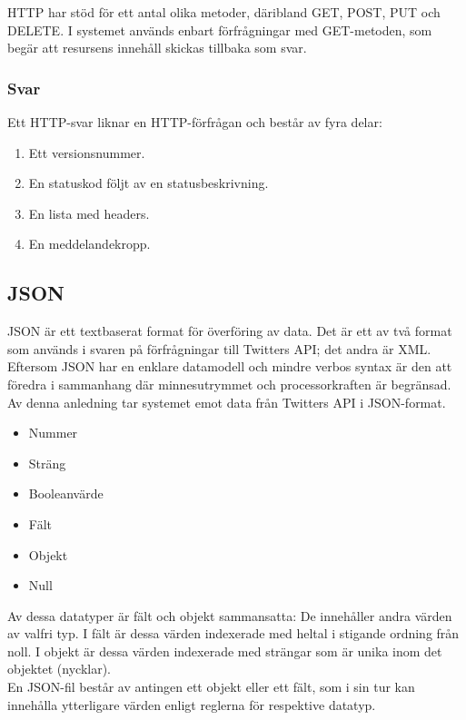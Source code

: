 \documentclass[a4paper,11pt]{article}
\begin{document}
HTTP har stöd för ett antal olika metoder, däribland GET, POST, PUT och DELETE. I systemet används enbart förfrågningar med GET-metoden, som begär att resursens innehåll skickas tillbaka som svar.
	
\subsubsection{Svar}
	
Ett HTTP-svar liknar en HTTP-förfrågan och består av fyra delar:

	\begin{enumerate}
    	\item Ett versionsnummer.
    	\item En statuskod följt av en statusbeskrivning.
    	\item En lista med headers.
    	\item En meddelandekropp.
    	\end{enumerate}

\subsection{JSON}

JSON är ett textbaserat format för överföring av data. Det är ett av två format som används i svaren på förfrågningar till Twitters API; det andra är XML. Eftersom JSON har en enklare datamodell och mindre verbos syntax är den att föredra i sammanhang där minnesutrymmet och processorkraften är begränsad. Av denna anledning tar systemet emot data från Twitters API i JSON-format.

	\begin{itemize}
	\item Nummer
    	\item Sträng
    	\item Booleanvärde
    	\item Fält
    	\item Objekt
    	\item Null
	\end{itemize}

Av dessa datatyper är fält och objekt sammansatta: De innehåller andra värden av valfri typ. I fält är dessa värden indexerade med heltal i stigande ordning från noll. I objekt är dessa värden indexerade med strängar som är unika inom det objektet (nycklar). \\

En JSON-fil består av antingen ett objekt eller ett fält, som i sin tur kan innehålla ytterligare värden enligt reglerna för respektive datatyp. \\
\end{document}
